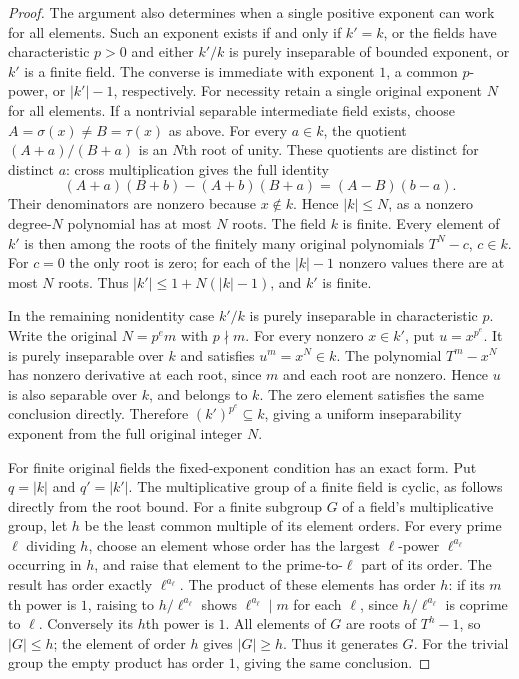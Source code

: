 \begin{proof}
The argument also determines when a
single positive exponent can work for
all elements. Such an exponent exists
if and only if $k'=k$, or the fields
have characteristic $p>0$ and either
$k'/k$ is purely inseparable of bounded
exponent, or $k'$ is a finite field.
The converse is immediate with exponent
$1$, a common $p$-power, or $|k'|-1$,
respectively. For necessity retain a
single original exponent $N$ for all
elements. If a nontrivial separable
intermediate field exists, choose
$A=\sigma(x)\neq B=\tau(x)$ as above.
For every $a\in k$, the quotient
$(A+a)/(B+a)$ is an $N$th root of unity.
These quotients are distinct for
distinct $a$: cross multiplication
gives the full identity
$$
(A+a)(B+b)-(A+b)(B+a)=(A-B)(b-a).
$$
Their denominators are nonzero because
$x\notin k$. Hence $|k|\leq N$, as a
nonzero degree-$N$ polynomial has at
most $N$ roots. The field $k$ is finite.
Every element of $k'$ is then among
the roots of the finitely many original
polynomials $T^N-c$, $c\in k$. For
$c=0$ the only root is zero; for
each of the $|k|-1$ nonzero values
there are at most $N$ roots. Thus
$|k'|\leq1+N(|k|-1)$, and $k'$ is finite.

In the remaining nonidentity case
$k'/k$ is purely inseparable in
characteristic $p$. Write the original
$N=p^e m$ with $p\nmid m$. For every
nonzero $x\in k'$, put $u=x^{p^e}$.
It is purely inseparable over $k$ and
satisfies $u^m=x^N\in k$. The polynomial
$T^m-x^N$ has nonzero derivative at
each root, since $m$ and each root
are nonzero. Hence $u$ is also
separable over $k$, and belongs to
$k$. The zero element satisfies the
same conclusion directly. Therefore
$(k')^{p^e}\subseteq k$, giving a
uniform inseparability exponent from
the full original integer $N$.

For finite original fields the fixed-exponent
condition has an exact form. Put $q=|k|$
and $q'=|k'|$. The multiplicative group
of a finite field is cyclic, as follows
directly from the root bound. For a
finite subgroup $G$ of a field's
multiplicative group, let $h$ be the
least common multiple of its element
orders. For every prime $\ell$ dividing
$h$, choose an element whose order
has the largest $\ell$-power $\ell^{a_\ell}$
occurring in $h$, and raise that element
to the prime-to-$\ell$ part of its
order. The result has order exactly
$\ell^{a_\ell}$. The product of these
elements has order $h$: if its $m$th
power is $1$, raising to
$h/\ell^{a_\ell}$ shows
$\ell^{a_\ell}\mid m$ for each $\ell$,
since $h/\ell^{a_\ell}$ is coprime
to $\ell$. Conversely its $h$th power
is $1$. All elements of $G$ are
roots of $T^h-1$, so $|G|\leq h$;
the element of order $h$ gives
$|G|\geq h$. Thus it generates $G$.
For the trivial group the empty
product has order $1$, giving the
same conclusion.


\end{proof}
